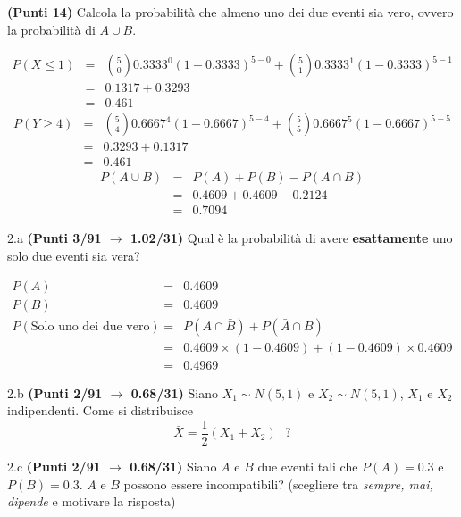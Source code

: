 \documentclass[
  11pt,
]{book}
\theoremstyle{mytheoremstyle}
\theoremstyle{mydefstyle}
\newenvironment{sol}
  {
  \begin{tcolorbox}[enhanced,breakable,arc=0.1mm,boxrule=1pt,colback=white,colframe=iblue,
  title=\bf \fontfamily{lmss}\selectfont \hspace{.5 cm} Soluzione,drop fuzzy shadow]

}{
\end{tcolorbox}
  }
\begin{document}
\textbf{(Punti 14)} Calcola la probabilità che almeno uno dei due eventi sia vero, ovvero la probabilità di \(A \cup B\).

\begin{sol}
\normalsize 
\begin{eqnarray*}
      P( X \leq 1 ) &=& \binom{ 5 }{ 0 } 0.3333 ^{ 0 }(1- 0.3333 )^{ 5 - 0 }+\binom{ 5 }{ 1 } 0.3333 ^{ 1 }(1- 0.3333 )^{ 5 - 1 } \\                 &=& 0.1317+0.3293 \\                 &=& 0.461 
   \end{eqnarray*}
\normalsize  \normalsize 
\begin{eqnarray*}
      P( Y \geq 4 ) &=& \binom{ 5 }{ 4 } 0.6667 ^{ 4 }(1- 0.6667 )^{ 5 - 4 }+\binom{ 5 }{ 5 } 0.6667 ^{ 5 }(1- 0.6667 )^{ 5 - 5 } \\                 &=& 0.3293+0.1317 \\                 &=& 0.461 
   \end{eqnarray*}
\normalsize 
\begin{eqnarray*}
  P(A\cup B) &=&  P(A)+P(B)-P(A\cap B)\\
  &=& 0.4609+0.4609-0.2124\\
  &=& 0.7094
\end{eqnarray*}

\end{sol}

2.a \textbf{(Punti 3/91 \(\rightarrow\) 1.02/31)} Qual è la probabilità di avere \textbf{esattamente} uno solo due eventi sia vera?

\begin{sol}
\begin{eqnarray*}
  P(A) &=&  0.4609\\
  P(B) &=& 0.4609\\
  P(\text{Solo uno dei due vero}) &=& P(A\cap\bar B)+P(\bar A\cap B)\\
  &=& 0.4609\times (1 - 0.4609)+(1-0.4609)\times  0.4609\\
  &=& 0.4969
\end{eqnarray*}

\end{sol}

2.b \textbf{(Punti 2/91 \(\rightarrow\) 0.68/31)} Siano \(X_1\sim N(5,1)\) e \(X_2\sim N(5,1)\), \(X_1\) e \(X_2\) indipendenti. Come si distribuisce
\[
\bar X = \frac 12 (X_1+X_2) ~~~?
\]

2.c \textbf{(Punti 2/91 \(\rightarrow\) 0.68/31)} Siano \(A\) e \(B\) due eventi tali che \(P(A)=0.3\) e \(P(B)=0.3\). \(A\) e \(B\) possono essere incompatibili? (scegliere tra \emph{sempre, mai, dipende} e motivare la risposta)
\end{document}
